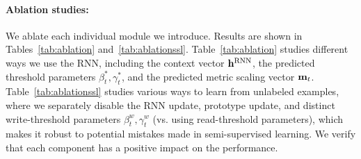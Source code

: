 \paragraph{Ablation studies:} We ablate each individual module we introduce. Results are shown in
Tables~\ref{tab:ablation} and~\ref{tab:ablationssl}. Table~\ref{tab:ablation} studies different ways
we use the RNN, including the context vector $\mathbf{h}^{\text{RNN}}$, the predicted threshold parameters
$\beta_t^*,\gamma_t^*$, and the predicted metric scaling vector $\mathbf{m}_{t}$. Table~\ref{tab:ablationssl}
studies various ways to learn from unlabeled examples, where we separately disable the RNN update,
prototype update, and distinct write-threshold parameters $\beta^w_t, \gamma^w_t$ (vs. using
read-threshold parameters), which makes it robust to potential mistakes made in
semi-supervised learning. We verify that each component has a positive impact on the performance.
